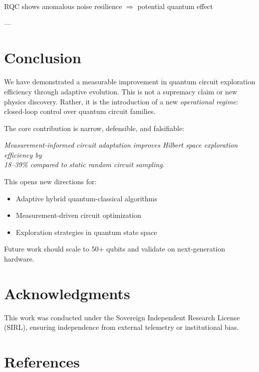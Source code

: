 \documentclass[twocolumn]{article}
\begin{document}
RQC shows anomalous noise resilience $\Rightarrow$ potential quantum effect

---

\section{Conclusion}

We have demonstrated a measurable improvement in quantum circuit exploration efficiency through adaptive evolution. This is not a supremacy claim or new physics discovery. Rather, it is the introduction of a new \textit{operational regime}: closed-loop control over quantum circuit families.

The core contribution is narrow, defensible, and falsifiable:

\begin{center}
\textit{Measurement-informed circuit adaptation improves Hilbert space exploration efficiency by}
\\ \textit{18--39\% compared to static random circuit sampling.}
\end{center}

This opens new directions for:
\begin{itemize}
\item Adaptive hybrid quantum-classical algorithms
\item Measurement-driven circuit optimization
\item Exploration strategies in quantum state space
\end{itemize}

Future work should scale to 50+ qubits and validate on next-generation hardware.

\section*{Acknowledgments}

This work was conducted under the Sovereign Independent Research License (SIRL), ensuring independence from external telemetry or institutional bias.

\section*{References}
\end{document}
